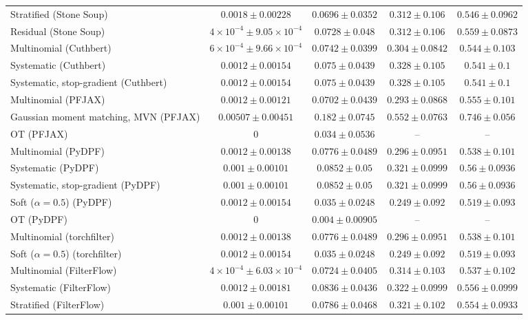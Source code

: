 \begin{table}[H]
\begin{adjustbox}{max width=\linewidth}
\begin{tabular}{lcccc}
Stratified (Stone Soup) & $0.0018\pm0.00228$ & $0.0696\pm0.0352$ & $0.312\pm0.106$ & $0.546\pm0.0962$ \\
Residual (Stone Soup) & $4\times10^{-4}\pm9.05\times10^{-4}$ & $0.0728\pm0.048$ & $0.312\pm0.106$ & $0.559\pm0.0873$ \\
Multinomial (Cuthbert) & $6\times10^{-4}\pm9.66\times10^{-4}$ & $0.0742\pm0.0399$ & $0.304\pm0.0842$ & $0.544\pm0.103$ \\
Systematic (Cuthbert) & $0.0012\pm0.00154$ & $0.075\pm0.0439$ & $0.328\pm0.105$ & $0.541\pm0.1$ \\
Systematic, stop-gradient (Cuthbert) & $0.0012\pm0.00154$ & $0.075\pm0.0439$ & $0.328\pm0.105$ & $0.541\pm0.1$ \\
Multinomial (PFJAX) & $0.0012\pm0.00121$ & $0.0702\pm0.0439$ & $0.293\pm0.0868$ & $0.555\pm0.101$ \\
Gaussian moment matching, MVN (PFJAX) & $0.00507\pm0.00451$ & $\mathbf{0.182\pm0.0745}$ & $\mathbf{0.552\pm0.0763}$ & $\mathbf{0.746\pm0.056}$ \\
OT (PFJAX) & $0$ & $0.034\pm0.0536$ & -- & -- \\
Multinomial (PyDPF) & $0.0012\pm0.00138$ & $0.0776\pm0.0489$ & $0.296\pm0.0951$ & $0.538\pm0.101$ \\
Systematic (PyDPF) & $0.001\pm0.00101$ & $0.0852\pm0.05$ & $0.321\pm0.0999$ & $0.56\pm0.0936$ \\
Systematic, stop-gradient (PyDPF) & $0.001\pm0.00101$ & $0.0852\pm0.05$ & $0.321\pm0.0999$ & $0.56\pm0.0936$ \\
Soft ($\alpha{=}0.5$) (PyDPF) & $0.0012\pm0.00154$ & $0.035\pm0.0248$ & $0.249\pm0.092$ & $0.519\pm0.093$ \\
OT (PyDPF) & $0$ & $0.004\pm0.00905$ & -- & -- \\
Multinomial (torchfilter) & $0.0012\pm0.00138$ & $0.0776\pm0.0489$ & $0.296\pm0.0951$ & $0.538\pm0.101$ \\
Soft ($\alpha{=}0.5$) (torchfilter) & $0.0012\pm0.00154$ & $0.035\pm0.0248$ & $0.249\pm0.092$ & $0.519\pm0.093$ \\
Multinomial (FilterFlow) & $4\times10^{-4}\pm6.03\times10^{-4}$ & $0.0724\pm0.0405$ & $0.314\pm0.103$ & $0.537\pm0.102$ \\
Systematic (FilterFlow) & $0.0012\pm0.00181$ & $0.0836\pm0.0436$ & $0.322\pm0.0999$ & $0.556\pm0.0999$ \\
Stratified (FilterFlow) & $0.001\pm0.00101$ & $0.0786\pm0.0468$ & $0.321\pm0.102$ & $0.554\pm0.0933$ \\

\end{tabular}
\end{adjustbox}
\end{table}
